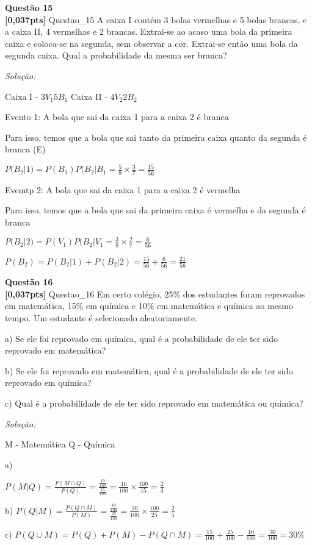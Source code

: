 \documentclass{article}
\newenvironment{problem}[2][Questão]
    { \begin{mdframed}[backgroundcolor=gray!20] \textbf{#1 #2} \\}
    {  \end{mdframed}}
\newenvironment{solution}
    {\textit{Solução:}}
    {}
\begin{document}
\begin{problem}{15}
\textbf{[0,037pts]} Questao\_15 A caixa I contém 3 bolas vermelhas e 5 bolas brancas, e a caixa II, 4 vermelhas e 2 brancas. Extrai-se ao acaso uma bola da primeira caixa e coloca-se na segunda, sem observar a cor. Extrai-se então uma bola da segunda caixa. Qual a probabilidade da mesma ser branca?
\end{problem}

\begin{solution}

Caixa I - $3V_{1} 5B_{1}$
Caixa II - $4V_{2} 2B_{2}$

Evento 1: A bola que sai da caixa 1 para a caixa 2 é branca

Para isso, temos que a bola que sai tanto da primeira caixa quanto da segunda é branca (E)

$P(B_{2}|1) = P(B_{1})P(B_{2}|B_{1} = \frac{5}{8} \times \frac{3}{7} = \frac{15}{56}$

Evemtp 2: A bola que sai da caixa 1 para a caixa 2 é vermelha

Para isso, temos que a bola que sai da primeira caixa é vermelha e da segunda é branca

$P(B_{2}|2) = P(V_{1})P(B_{2}|V_{1} = \frac{3}{8} \times \frac{2}{7} = \frac{6}{56}$

$P(B_{2}) = P(B_{2}|1) + P(B_{2}|2) = \frac{15}{56} + \frac{6}{56} = \frac{21}{56}$

\end{solution}

\begin{problem}{16}
\textbf{[0,037pts]} Questao\_16 Em certo colégio, 25\% dos estudantes foram reprovados em matemática, 15\% em química 
e 10\% em matemática e química ao mesmo tempo. Um estudante é selecionado aleatoriamente.

a)  Se  ele  foi  reprovado  em  química,  qual  é  a  probabilidade  de  ele  ter  sido  reprovado  em 
matemática? 

b) Se  ele  foi  reprovado  em  matemática,  qual  é  a  probabilidade  de  ele  ter  sido  reprovado  em 
química? 

c) Qual é a probabilidade de ele ter sido reprovado em matemática ou química?

\end{problem}

\begin{solution}

M - Matemática
Q - Química

a)

$P(M|Q) = \frac{P(M \cap Q)}{P(Q)} = \frac{\frac{10}{100}}{\frac{15}{100}} = \frac{10}{100} \times \frac{100}{15} = \frac{2}{3}$

b)
$P(Q|M) = \frac{P(Q \cap M)}{P(M)} = \frac{\frac{10}{100}}{\frac{25}{100}} = \frac{10}{100} \times \frac{100}{25} = \frac{2}{5}$

c)
$P(Q \cup M) = P(Q) + P(M) - P(Q \cap M) = \frac{15}{100} + \frac{25}{100} - \frac{10}{100} = \frac{30}{100} = 30\%$


\end{solution}
\end{document}
